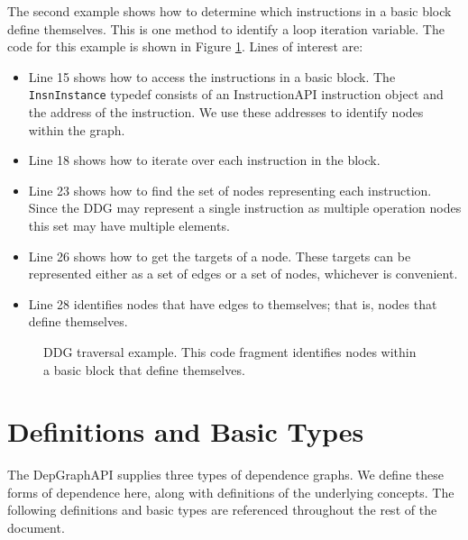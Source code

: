 \documentclass[12pt,titlepage]{article}
\begin{document}
The second example shows how to determine which instructions in a
basic block define themselves. This is one method to identify a loop
iteration variable. The code for this example is shown in Figure
\ref{example2}. Lines of interest are:
\begin{itemize}
\item Line 15 shows how to access the instructions in a basic
  block. The \texttt{InsnInstance} typedef consists of an
  InstructionAPI instruction object and the address of the
  instruction. We use these addresses to identify nodes within the
  graph.
\item Line 18 shows how to iterate over each instruction in the block.
\item Line 23 shows how to find the set of nodes representing each
  instruction. Since the DDG may represent a single instruction as
  multiple operation nodes this set may have multiple elements. 
\item Line 26 shows how to get the targets of a node. These targets
  can be represented either as a set of edges or a set of nodes,
  whichever is convenient. 
\item Line 28 identifies nodes that have edges to themselves; that is,
  nodes that define themselves. 
\end{itemize}

\begin{figure}

\caption{DDG traversal example. This code fragment identifies nodes
  within a basic block that define themselves.}
\label{example2}
\end{figure}


\section{Definitions and Basic Types}

The DepGraphAPI supplies three types of dependence graphs. We define
these forms of dependence here, along with definitions of the
underlying concepts. The following definitions and basic types are
referenced throughout the rest of the document.
\end{document}
